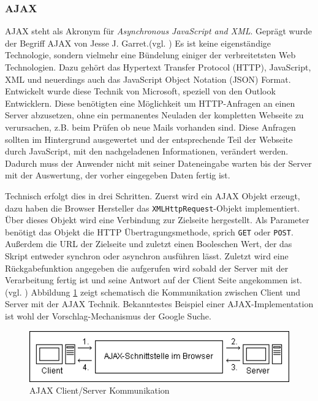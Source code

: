 \subsubsection{AJAX}
AJAX steht als Akronym für \textit{Asynchronous JavaScript and XML}. Geprägt wurde der Begriff AJAX von Jesse J. Garret.(vgl. \cite{JesseJGarret}) Es ist keine eigenständige Technologie, sondern vielmehr eine Bündelung einiger der verbreitetsten Web Technologien. Dazu gehört das Hypertext Transfer Protocol (HTTP), JavaScript, XML und neuerdings auch das JavaScript Object Notation (JSON) Format. Entwickelt wurde diese Technik von Microsoft, speziell von den Outlook Entwicklern. Diese benötigten eine Möglichkeit um HTTP-Anfragen an einen Server abzusetzen, ohne ein permanentes Neuladen der kompletten Webseite zu verursachen, z.B. beim Prüfen ob neue Mails vorhanden sind. Diese Anfragen sollten im Hintergrund ausgewertet und der entsprechende Teil der Webseite durch JavaScript, mit den nachgeladenen Informationen, verändert werden. Dadurch muss der Anwender nicht mit seiner Dateneingabe warten bis der Server mit der Auswertung, der vorher eingegeben Daten fertig ist.\par Technisch erfolgt dies in drei Schritten. Zuerst wird ein AJAX Objekt erzeugt, dazu haben die Browser Hersteller das \texttt{XMLHttpRequest}-Objekt implementiert. Über dieses Objekt wird eine Verbindung zur Zielseite hergestellt. Als Parameter benötigt das Objekt die HTTP Übertragungsmethode, sprich \texttt{GET} oder \texttt{POST}. Außerdem die URL der Zielseite und zuletzt einen Booleschen Wert, der das Skript entweder synchron oder asynchron ausführen lässt. Zuletzt wird eine Rückgabefunktion angegeben die aufgerufen wird sobald der Server mit der Verarbeitung fertig ist und seine Antwort auf der Client Seite angekommen ist.(vgl. \cite[S.392ff]{WenzJava2008}) Abbildung \ref{fig:ajax} zeigt schematisch die Kommunikation zwischen Client und Server mit der AJAX Technik. Bekanntestes Beispiel einer AJAX-Implementation ist wohl der Vorschlag-Mechanismus der Google Suche.

\vspace{1em}
\begin{figure}[htb]
  \centering
  \includegraphics[width=1\textwidth]{abb/ajax_uml}
  \caption[AJAX Client/Server Kommunikation]{AJAX Client/Server Kommunikation \cite{ajax}}
  \label{fig:ajax}
\end{figure}

